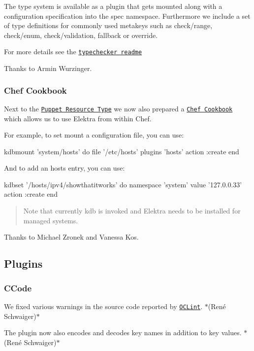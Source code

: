 The type system is available as a plugin that gets mounted along with a configuration specification into the spec namespace. Furthermore we include a set of type definitions for commonly used metakeys such as {\ttfamily check/range}, {\ttfamily check/enum}, {\ttfamily check/validation}, {\ttfamily fallback} or {\ttfamily override}.

For more details see the \href{https://www.libelektra.org/plugins/typechecker}{\tt typechecker readme}

Thanks to Armin Wurzinger.

\subsubsection*{Chef Cookbook}

Next to the \href{http://puppet.libelektra.org/}{\tt Puppet Resource Type} we now also prepared a \href{https://supermarket.chef.io/cookbooks/kdb}{\tt Chef Cookbook} which allows us to use Elektra from within Chef.

For example, to set mount a configuration file, you can use\+:


\begin{DoxyCode}
kdbmount 'system/hosts' do
        file '/etc/hosts'
        plugins 'hosts'
        action :create
end
\end{DoxyCode}


And to add an hosts entry, you can use\+:


\begin{DoxyCode}
kdbset '/hosts/ipv4/showthatitworks' do
        namespace 'system'
        value '127.0.0.33'
        action :create
end
\end{DoxyCode}


\begin{quote}
Note that currently {\ttfamily kdb} is invoked and Elektra needs to be installed for managed systems. \end{quote}


Thanks to Michael Zronek and Vanessa Kos.

\subsection*{Plugins}

\subsubsection*{C\+Code}


\begin{DoxyItemize}
\item We fixed various warnings in the source code reported by \href{http://oclint.org}{\tt O\+C\+Lint}. $\ast$(René Schwaiger)$\ast$
\item The plugin now also encodes and decodes key names in addition to key values. $\ast$(René Schwaiger)$\ast$
\end{DoxyItemize}

